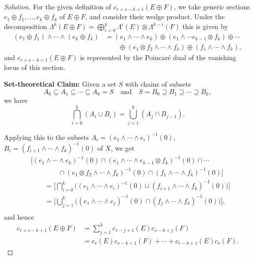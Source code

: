 \documentclass{article}
\theoremstyle{definition}
\begin{document}
\begin{proof}[Solution]
    For the given definition of $c_{r+s-k+1}(E\oplus F)$, we take generic
    sections $e_1\oplus f_1,\ldots,e_k\oplus f_k$ of $E\oplus F$, and consider
    their wedge product. Under the decomposition
    $\Lambda^k(E\oplus F)=\bigoplus_{i=0}^k\Lambda^i(E)\otimes\Lambda^{k-i}(F)$
    this is given by
    \begin{align*}
        (e_1\oplus f_1)\wedge\cdots\wedge(e_k\oplus f_k)
            &= (e_1\wedge\cdots\wedge e_k)
                \oplus(e_1\wedge\cdots e_{k-1}\otimes f_k)
                \oplus\cdots \\
            &\qquad\oplus(e_1\otimes f_2\wedge\cdots\wedge f_k)
                \oplus(f_1\wedge\cdots\wedge f_k),
    \end{align*}
    and $c_{r+s-k+1}(E\oplus F)$ is represented by the Poincar\'e dual of the
    vanishing locus of this section.

    \textbf{Set-theoretical Claim:} Given a set $S$ with chains of subsets
    \begin{equation*}
        A_0\subseteq A_1\subseteq\cdots\subseteq A_k=S
        \quad\text{and}\quad
        S=B_0\supseteq B_1\supseteq\cdots\supseteq B_k,
    \end{equation*}
    we have
    \begin{equation*}
        \bigcap_{i=0}^k(A_i\cup B_i)
            = \bigcup_{j=1}^k(A_j\cap B_{j-1}).
    \end{equation*}

    Applying this to the subsets $A_i=(e_1\wedge\cdots\wedge e_i)^{-1}(0)$,
    $B_i=(f_{i+1}\wedge\cdots\wedge f_k)^{-1}(0)$ of $X$, we get
    \begin{align*}
        &\bigl[(e_1\wedge\cdots\wedge e_k)^{-1}(0)
            \cap(e_1\wedge\cdots\wedge e_{k-1}\otimes f_k)^{-1}(0)
            \cap\cdots \\
        &\qquad\qquad\cap(e_1\otimes f_2\wedge\cdots\wedge f_k)^{-1}(0)
            \cap(f_1\wedge\cdots\wedge f_k)^{-1}(0)
        \bigr] \\
        &\qquad=\biggl[\bigcap_{i=0}^k
            \bigl((e_1\wedge\cdots\wedge e_i)^{-1}(0)
        \cup(f_{i+1}\wedge\cdots\wedge f_k)^{-1}(0)\bigr)\biggr] \\
        &\qquad=\biggl[\bigcup_{j=1}^k
            \bigl((e_1\wedge\cdots\wedge e_j)^{-1}(0)
            \cap(f_j\wedge\cdots\wedge f_k)^{-1}(0)\bigr)\biggr], \\
    \end{align*}
    and hence
    \begin{align*}
        c_{r+s-k+1}(E\oplus F)
            &= \sum_{j=1}^kc_{r-j+1}(E)c_{s-k+j}(F) \\
            &= c_r(E)c_{s-k+1}(F) + \cdots + c_{r-k+1}(E)c_s(F).
    \end{align*}
\end{proof}
\end{document}
